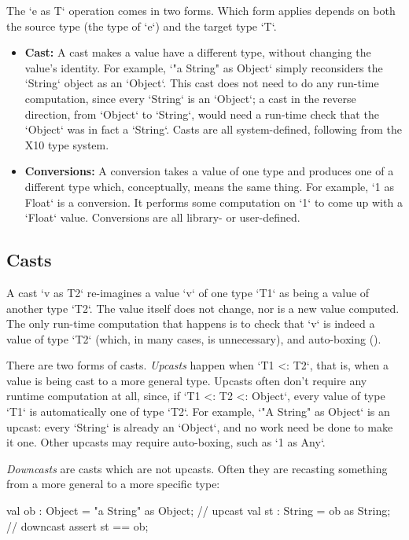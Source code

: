 The \xcd`e as T` operation comes in two forms.  Which form applies depends on
both the source type (the type of \xcd`e`) and the target type \xcd`T`.
\begin{itemize}
\item {\bf Cast:} A cast makes a value have a different type, without changing
      the value's identity.  For example, \xcd`"a String" as Object` simply
      reconsiders the \xcd`String` object as an \xcd`Object`.  
      This cast does not need to do any 
      run-time computation, since every \xcd`String` is an \xcd`Object`; a
      cast in the reverse direction, from \xcd`Object` to \xcd`String`, would
      need a run-time check that the \xcd`Object`
      was in fact a \xcd`String`.
      Casts are all system-defined, following from the
      X10 type system.
\item {\bf Conversions:} A conversion takes a value of one type and produces
      one of a different type which, conceptually, means the same thing.  
      For example, \xcd`1 as Float` is a conversion.  It performs some
      computation on \xcd`1`  to come up with a \xcd`Float` value.
      Conversions are all library- or user-defined.  
\end{itemize}

\subsection{Casts}

A cast \xcd`v as T2` re-imagines a value \xcd`v` of one type \xcd`T1` as being
a value of another 
type \xcd`T2`.  The
value itself does not change, nor is a new value computed.  The only
run-time computation that happens is to check that \xcd`v` is indeed a value
of type \xcd`T2` (which, in many cases, is unnecessary), and auto-boxing ().

There are two forms of casts.  {\em Upcasts} happen when \xcd`T1 <: T2`, that
is, when a value is being cast to a more general type.  Upcasts often don't require
any runtime computation at all, since, if \xcd`T1 <: T2 <: Object`, every value of type
\xcd`T1` is automatically one of type \xcd`T2`.   For example, 
\xcd`"A String" as Object` is an upcast: every \xcd`String` is already an
\xcd`Object`, and no work need be done to make it one.  Other upcasts may
require auto-boxing, such as \xcd`1 as Any`.  

{\em Downcasts} are casts which are not upcasts.  Often they are recasting
something from a more general to a more specific type: 
\begin{xten}
   val ob : Object = "a String" as Object; // upcast
   val st : String = ob as String;         // downcast
   assert st == ob;
\end{xten}
 
